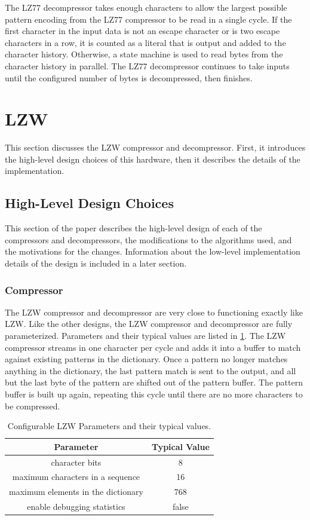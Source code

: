 \documentclass[doublespace,nopageskip]{VTthesis}
\begin{document}
The LZ77 decompressor takes enough characters to allow the largest possible pattern encoding from the LZ77 compressor to be read in a single cycle. If the first character in the input data is not an escape character or is two escape characters in a row, it is counted as a literal that is output and added to the character history. Otherwise, a state machine is used to read bytes from the character history in parallel. The LZ77 decompressor continues to take inputs until the configured number of bytes is decompressed, then finishes.

\section{LZW}\label{se:lzw}
This section discusses the LZW compressor and decompressor. First, it introduces the high-level design choices of this hardware, then it describes the details of the implementation.

\subsection{High-Level Design Choices}\label{se:high-level_design_choices}
This section of the paper describes the high-level design of each of the compressors and decompressors, the modifications to the algorithms used, and the motivations for the changes. Information about the low-level implementation details of the design is included in a later section.

\subsubsection{Compressor}\label{sss:lzw_compressor_design}
The LZW compressor and decompressor are very close to functioning exactly like LZW. Like the other designs, the LZW compressor and decompressor are fully parameterized. Parameters and their typical values are listed in \ref{tab:lzw-configuration-table}. The LZW compressor streams in one character per cycle and adds it into a buffer to match against existing patterns in the dictionary. Once a pattern no longer matches anything in the dictionary, the last pattern match is sent to the output, and all but the last byte of the pattern are shifted out of the pattern buffer. The pattern buffer is built up again, repeating this cycle until there are no more characters to be compressed.

\begin{table}[htb]
	\centering
	\caption{Configurable LZW Parameters and their typical values.}
	\begin{tabular}{cc}
	    \toprule
	    Parameter & Typical Value \\
	    \midrule
	    character bits & 8 \\
	    \midrule
	    maximum characters in a sequence & 16 \\
	    \midrule
	    maximum elements in the dictionary & 768 \\ 
	    \midrule
	    enable debugging statistics & false \\
	    \bottomrule
	\end{tabular}
	\label{tab:lzw-configuration-table}
\end{table}
\end{document}
